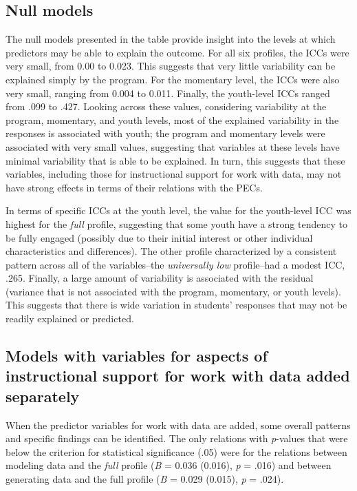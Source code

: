 \documentclass[]{msu-thesis}
\theoremstyle{definition}
\theoremstyle{definition}
\theoremstyle{definition}
\theoremstyle{remark}
\begin{document}
\subsection{Null models}\label{null-models}

The null models presented in the table provide insight into the levels
at which predictors may be able to explain the outcome. For all six
profiles, the ICCs were very small, from 0.00 to 0.023. This suggests
that very little variability can be explained simply by the program. For
the momentary level, the ICCs were also very small, ranging from 0.004
to 0.011. Finally, the youth-level ICCs ranged from .099 to .427.
Looking across these values, considering variability at the program,
momentary, and youth levels, most of the explained variability in the
responses is associated with youth; the program and momentary levels
were associated with very small values, suggesting that variables at
these levels have minimal variability that is able to be explained. In
turn, this suggests that these variables, including those for
instructional support for work with data, may not have strong effects in
terms of their relations with the PECs.

In terms of specific ICCs at the youth level, the value for the
youth-level ICC was highest for the \emph{full} profile, suggesting that
some youth have a strong tendency to be fully engaged (possibly due to
their initial interest or other individual characteristics and
differences). The other profile characterized by a consistent pattern
across all of the variables--the \emph{universally low} profile--had a
modest ICC, .265. Finally, a large amount of variability is associated
with the residual (variance that is not associated with the program,
momentary, or youth levels). This suggests that there is wide variation
in students' responses that may not be readily explained or predicted.

\subsection{Models with variables for aspects of instructional support
for work with data added
separately}\label{models-with-variables-for-aspects-of-instructional-support-for-work-with-data-added-separately}

When the predictor variables for work with data are added, some overall
patterns and specific findings can be identified. The only relations
with \emph{p}-values that were below the criterion for statistical
significance (.05) were for the relations between modeling data and the
\emph{full} profile (\emph{B} = 0.036 (0.016), \emph{p} = .016) and
between generating data and the full profile (\emph{B} = 0.029 (0.015),
\emph{p} = .024).
\end{document}
